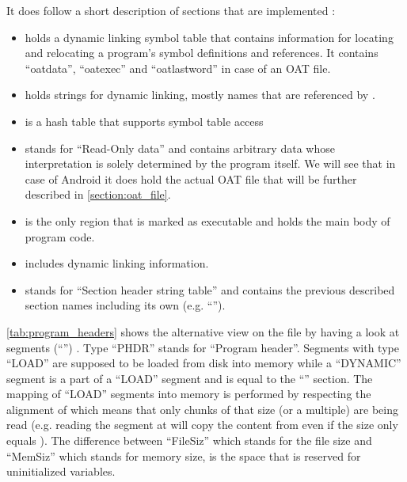 It does follow a short description of sections that are implemented
\parencite{life_of_binaries}:
\begin{itemize}
    \item {} holds a dynamic linking symbol table that
    contains information for locating and relocating a program's
    symbol definitions and references. It contains ``oatdata'',
    ``oatexec'' and ``oatlastword'' in case of an OAT file.
    \item {} holds strings for dynamic linking,
    mostly names that are referenced by .
    \item {} is a hash table that supports symbol table access
    \item {} stands for ``Read-Only data'' and contains arbitrary data whose interpretation is solely
    determined by the program itself. We will
    see that in case of Android it does hold the actual OAT file
    that will be further described in \autoref{section:oat_file}.
    \item {} is the only region that is marked as
    executable and holds the main body of
    program code.
    \item {} includes dynamic linking information.
    \item {} stands for ``Section header string
    table'' and contains the previous described
    section names including its own (e.g. ``'').
\end{itemize}

\autoref{tab:program_headers} shows the alternative view on the
file by having a look at segments (``'')
. Type ``PHDR'' stands for ``Program header''. Segments with type
``LOAD'' are supposed to be loaded from disk into memory while
a ``DYNAMIC'' segment is a part of a ``LOAD'' segment and is equal
to the ``'' section. The mapping of ``LOAD'' segments
into memory is performed by respecting the alignment of 
which means that only chunks of that size (or a multiple) are being read
(e.g. reading the segment at  will copy the content
from  even if the size only equals ).
The difference between ``FileSiz'' which stands for the file
size and ``MemSiz'' which stands for memory size, is the space that
is reserved for uninitialized variables.

